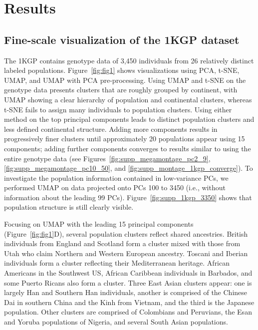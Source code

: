 \clearpage

\section{Results}
\subsection{Fine-scale visualization of the 1KGP dataset}

The 1KGP contains genotype data of 3,450 individuals from 26 relatively distinct labeled populations\citep{10002015global}. Figure~\ref{fig:fig1} shows visualizations using PCA, t-SNE, UMAP, and UMAP with PCA pre-processing. Using UMAP and t-SNE on the genotype data presents clusters that are roughly grouped by continent, with UMAP showing a clear hierarchy of population and continental clusters, whereas t-SNE fails to assign many individuals to population clusters. Using either method on the top principal components leads to distinct population clusters and less defined continental structure. Adding more components results in progressively finer clusters until approximately 20 populations appear using 15 components; adding further components converges to results similar to using the entire genotype data (see Figures~\ref{fig:supp_megamontage_pc2_9}, \ref{fig:supp_megamontage_pc10_50}, and \ref{fig:supp_montage_1kgp_converge}). To investigate the population information contained in low-variance PCs, we performed UMAP on data projected onto PCs 100 to 3450 (i.e., without information about the leading 99 PCs). Figure~\ref{fig:supp_1kgp_3350} shows that population structure is still clearly visible.

Focusing on UMAP with the leading 15 principal components (Figure~\ref{fig:fig1}D), several population clusters reflect shared ancestries. British individuals from England and Scotland form a cluster mixed with those from Utah who claim Northern and Western European ancestry. Toscani and Iberian individuals form a cluster reflecting their Mediterranean heritage. African Americans in the Southwest US, African Caribbean individuals in Barbados, and some Puerto Ricans also form a cluster. Three East Asian clusters appear: one is largely Han and Southern Han individuals, another is comprised of the Chinese Dai in southern China and the Kinh from Vietnam, and the third is the Japanese population. Other clusters are comprised of Colombians and Peruvians, the Esan and Yoruba populations of Nigeria, and several South Asian populations. 

